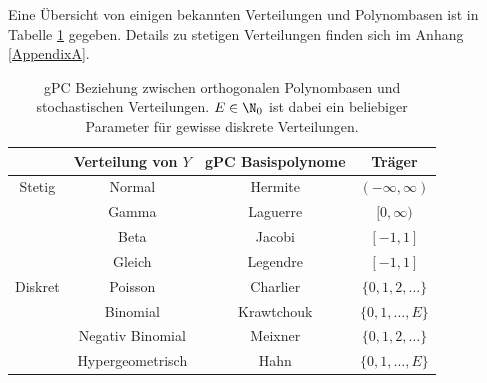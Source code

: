 Eine Übersicht von einigen bekannten Verteilungen und Polynombasen ist in Tabelle \ref{table:chaos} gegeben. Details zu stetigen Verteilungen finden sich im Anhang \ref{AppendixA}.\\
\begin{table}
\centering
\begin{tabular}{c|ccc}
 & Verteilung von $Y$ & gPC Basispolynome & Träger \\ 
\hline 
Stetig & Normal & Hermite & $(-\infty,\infty)$ \\ 
 & Gamma & Laguerre & $[0,\infty)$ \\ 
 & Beta & Jacobi & $[-1,1]$ \\
 & Gleich & Legendre & $[-1,1]$ \\  
\hline 
Diskret & Poisson & Charlier & $\lbrace 0,1,2,\dots\rbrace$ \\ 
 & Binomial & Krawtchouk & $\lbrace 0,1,\dots,E\rbrace$ \\ 
 & Negativ Binomial & Meixner & $\lbrace 0,1,2,\dots\rbrace$ \\  
 & Hypergeometrisch & Hahn & $\lbrace 0,1,\dots,E\rbrace$
\end{tabular}
\caption{gPC Beziehung zwischen orthogonalen Polynombasen und stochastischen Verteilungen. $E\in\N_0$ ist dabei ein beliebiger Parameter für gewisse diskrete Verteilungen.}
\label{table:chaos}
\end{table}

